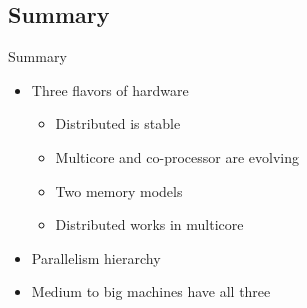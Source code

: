 \subsection{Summary}
\makesubcontentsslidessec

\begin{frame}
  \begin{block}{Summary}
    \begin{itemize}
    \item Three flavors of hardware 
      \begin{itemize}
      \item Distributed is stable
      \item Multicore and co-processor are evolving
      \item Two memory models
      \item Distributed works in multicore
      \end{itemize}
    \item Parallelism hierarchy
    \item Medium to big machines have all three
    \end{itemize}
  \end{block}
\end{frame}